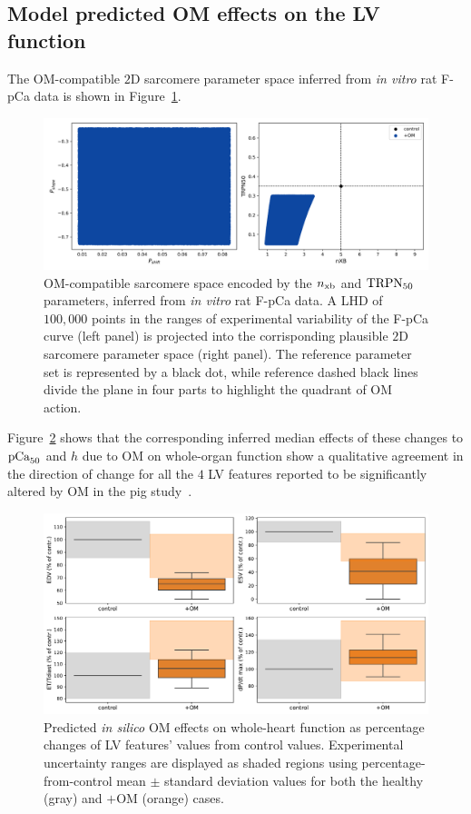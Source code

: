 %
%
%
\subsection{Model predicted OM effects on the LV function}
The OM-compatible $2$D sarcomere parameter space inferred from \textit{in vitro} rat F-pCa data is shown in Figure~\ref{fig:deltas}.

\begin{figure}[!ht]
    \myfloatalign
    \includegraphics[width=\textwidth]{figures/chapter05/Deltas_and_params_with_OM_blue.png}
    \caption{OM-compatible sarcomere space encoded by the $n_{\textrm{xb}}$ and $\textrm{TRPN}_{50}$ parameters, inferred from \textit{in vitro} rat F-pCa data. A LHD of $100,000$ points in the ranges of experimental variability of the F-pCa curve (left panel) is projected into the corrisponding plausible $2$D sarcomere parameter space (right panel). The reference parameter set is represented by a black dot, while reference dashed black lines divide the plane in four parts to highlight the quadrant of OM action.}
    \label{fig:deltas}
\end{figure}

\vspace{0.2cm}
Figure~\ref{fig:lvfeatsdistr} shows that the corresponding inferred median effects of these changes to $\textrm{pCa}_{50}$ and $h$ due to OM on whole-organ function show a qualitative agreement in the direction of change for all the $4$ LV features reported to be significantly altered by OM in the pig study~\cite{Bakkehaug:2015}.

\begin{figure}[!ht]
    \myfloatalign
    \includegraphics[width=\textwidth]{figures/chapter05/Fig3.pdf}
    \caption{Predicted \textit{in silico} OM effects on whole-heart function as percentage changes of LV features' values from control values. Experimental uncertainty ranges are displayed as shaded regions using percentage-from-control mean $\pm$ standard deviation values for both the healthy (gray) and $+$OM (orange) cases.}
    \label{fig:lvfeatsdistr}
\end{figure}


